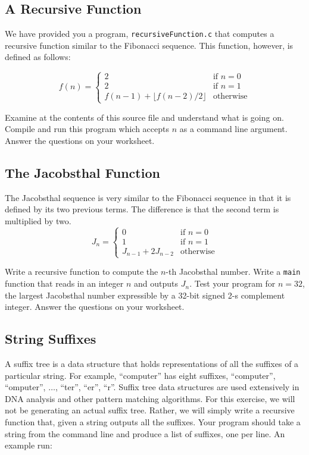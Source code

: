 \documentclass[12pt]{scrartcl}
\begin{document}
\subsection{A Recursive Function}

We have provided you a program, \texttt{recursiveFunction.c} 
that computes a recursive function similar to the Fibonacci sequence.  
This function, however, is defined as follows: 

$$f(n) = \left\{
\begin{array}{ll}
2 & \textrm{if } n = 0 \\
2 & \textrm{if } n = 1 \\
f(n-1) + \lfloor f(n-2) / 2 \rfloor & \textrm{otherwise}
\end{array}
\right.$$

Examine at the contents of this source file and understand what is 
going on.  Compile and run this program which accepts $n$ as a 
command line argument.  Answer the questions on your worksheet.

\subsection{The Jacobsthal Function}

The Jacobsthal sequence is very similar to the Fibonacci sequence 
in that it is defined by its two previous terms.  The difference is that 
the second term is multiplied by two.  
$$J_n = \left\{
\begin{array}{ll}
0 & \textrm{if } n = 0 \\
1 & \textrm{if } n = 1 \\
J_{n-1} + 2J_{n-2} & \textrm{otherwise}
\end{array}
\right.$$

Write a recursive function to compute the $n$-th Jacobsthal number.  
Write a \texttt{main} function that reads in an integer $n$ and 
outputs $J_n$.  Test your program for $n = 32$, the largest Jacobsthal 
number expressible by a 32-bit signed 2-s complement integer.  
Answer the questions on your worksheet.

\subsection{String Suffixes}

A suffix tree is a data structure that holds representations of all the 
suffixes of a particular string.  For example, ``computer'' has eight 
suffixes, ``computer'', ``omputer'', $\ldots$, ``ter'', ``er'', ``r''.  Suffix 
tree data structures are used extensively in DNA analysis and other 
pattern matching algorithms.  For this exercise, we will not be 
generating an actual suffix tree.  Rather, we will simply write a 
recursive function that, given a string outputs all the suffixes.  
Your program should take a string from the command line and 
produce a list of suffixes, one per line.  An example run: 
\end{document}
